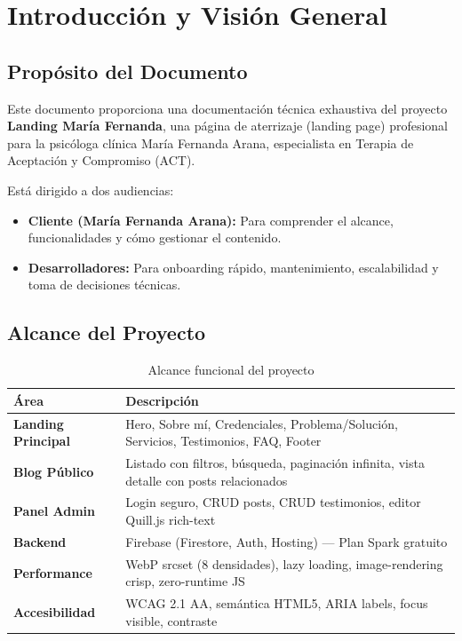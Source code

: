\documentclass[12pt,a4paper,spanish]{report}
\begin{document}
\listoffigures
\listoftables
\clearpage

\chapter{Introducción y Visión General}
\label{ch:introduccion}

\section{Propósito del Documento}
Este documento proporciona una documentación técnica exhaustiva del proyecto \textbf{Landing María Fernanda}, una página de aterrizaje (landing page) profesional para la psicóloga clínica María Fernanda Arana, especialista en Terapia de Aceptación y Compromiso (ACT).

Está dirigido a dos audiencias:
\begin{itemize}
    \item \textbf{Cliente (María Fernanda Arana):} Para comprender el alcance, funcionalidades y cómo gestionar el contenido.
    \item \textbf{Desarrolladores:} Para onboarding rápido, mantenimiento, escalabilidad y toma de decisiones técnicas.
\end{itemize}

\section{Alcance del Proyecto}
\begin{table}[H]
    \centering
    \caption{Alcance funcional del proyecto}
    \label{tab:alcance}
    \begin{tabular}{>{\bfseries}ll}
        \toprule
        \textbf{Área} & \textbf{Descripción} \\
        \midrule
        Landing Principal & Hero, Sobre mí, Credenciales, Problema/Solución, Servicios, Testimonios, FAQ, Footer \\
        Blog Público & Listado con filtros, búsqueda, paginación infinita, vista detalle con posts relacionados \\
        Panel Admin & Login seguro, CRUD posts, CRUD testimonios, editor Quill.js rich-text \\
        Backend & Firebase (Firestore, Auth, Hosting) — Plan Spark gratuito \\
        Performance & WebP srcset (8 densidades), lazy loading, image-rendering crisp, zero-runtime JS \\
        Accesibilidad & WCAG 2.1 AA, semántica HTML5, ARIA labels, focus visible, contraste \\
    \bottomrule
    \end{tabular}
\end{table}
\end{document}
